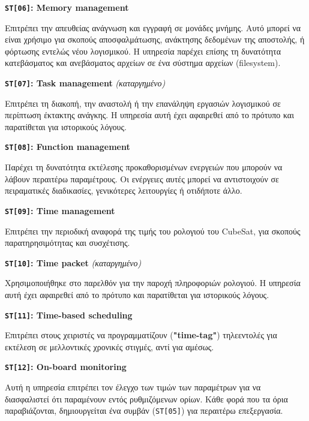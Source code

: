 \documentclass[a4paper,nobib]{tufte-book}
\begin{document}
\begin{compactitem}
		\item \textbf{\texttt{ST[06]}: Memory management}
		
		Επιτρέπει την απευθείας ανάγνωση και εγγραφή σε μονάδες μνήμης. Αυτό μπορεί να είναι χρήσιμο για σκοπούς αποσφαλμάτωσης, ανάκτησης δεδομένων της αποστολής, ή φόρτωσης εντελώς νέου λογισμικού. Η υπηρεσία παρέχει επίσης τη δυνατότητα κατεβάσματος και ανεβάσματος αρχείων σε ένα σύστημα αρχείων (filesystem).
		
		\item \textbf{\texttt{ST[07]}: Task management} \emph{(καταργημένο)}
		
		Επιτρέπει τη διακοπή, την αναστολή ή την επανάληψη εργασιών λογισμικού σε περίπτωση έκτακτης ανάγκης. Η υπηρεσία αυτή έχει αφαιρεθεί από το πρότυπο και παρατίθεται για ιστορικούς λόγους.
		
		\item \textbf{\texttt{ST[08]}: Function management}
		
		Παρέχει τη δυνατότητα εκτέλεσης προκαθορισμένων ενεργειών που μπορούν να λάβουν περαιτέρω παραμέτρους. Οι ενέργειες αυτές μπορεί να αντιστοιχούν σε πειραματικές διαδικασίες, γενικότερες λειτουργίες ή οτιδήποτε άλλο.
		
		\item \textbf{\texttt{ST[09]}: Time management}
		
		Επιτρέπει την περιοδική αναφορά της τιμής του ρολογιού του CubeSat, για σκοπούς παρατηρησιμότητας και συσχέτισης.
		
		\item \textbf{\texttt{ST[10]}: Time packet} \emph{(καταργημένο)}
		
		Χρησιμοποιήθηκε στο παρελθόν για την παροχή πληροφοριών ρολογιού. Η υπηρεσία αυτή έχει αφαιρεθεί από το πρότυπο και παρατίθεται για ιστορικούς λόγους.
		
		\item \textbf{\texttt{ST[11]}: Time-based scheduling}
		
		Επιτρέπει στους χειριστές να προγραμματίζουν (\textbf{"time-tag"}) τηλεεντολές για εκτέλεση σε μελλοντικές χρονικές στιγμές, αντί για αμέσως.
		
		\item \textbf{\texttt{ST[12]}: On-board monitoring}
		
		Αυτή η υπηρεσία επιτρέπει τον έλεγχο των τιμών των παραμέτρων για να διασφαλιστεί ότι παραμένουν εντός ρυθμιζόμενων ορίων. Κάθε φορά που τα όρια παραβιάζονται, δημιουργείται ένα συμβάν (\texttt{ST[05]}) για περαιτέρω επεξεργασία.
		

\end{compactitem}
\end{document}
